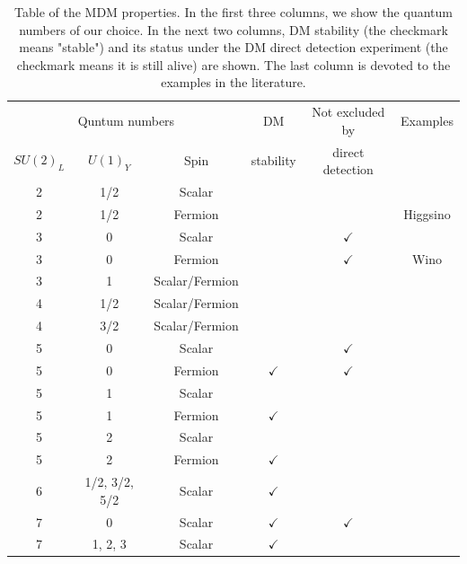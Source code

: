 \documentclass[12pt,twoside,book]{article}
\begin{document}
\begin{table}
  \centering
  \begin{tabular}{ccc|c|c|c}
    \multicolumn{3}{c|}{Quntum numbers} & DM & Not excluded by & Examples\\
    $SU(2)_L$ & $U(1)_Y$ & Spin & stability & direct detection & \\ \hline
    \hline
    2 & 1/2 & Scalar & & & \\
    2 & 1/2 & Fermion & & & Higgsino\\ \hline
    3 & 0 & Scalar & & $\checkmark$ & \cite{Farina:2013mla} \\
    3 & 0 & Fermion & & $\checkmark$ & Wino\\
    3 & 1 & Scalar/Fermion & & & \cite{Farina:2013mla} \\ \hline
    4 & 1/2 & Scalar/Fermion & & & \cite{Farina:2013mla} \\
    4 & 3/2 & Scalar/Fermion & & & \cite{Farina:2013mla} \\ \hline
    5 & 0 & Scalar & & $\checkmark$ & \cite{Farina:2013mla} \\
    5 & 0 & Fermion & $\checkmark$ & $\checkmark$ &
      \cite{Cirelli:2005uq, Cirelli:2007xd, Cirelli:2009uv} \\
    5 & 1 & Scalar & & & \\
    5 & 1 & Fermion & $\checkmark$ & & \\
    5 & 2 & Scalar & & & \\
    5 & 2 & Fermion & $\checkmark$ & & \\ \hline
    6 & 1/2, 3/2, 5/2 & Scalar & $\checkmark$ & & \\ \hline
    7 & 0 & Scalar & $\checkmark$ & $\checkmark$ &
      \cite{Cirelli:2005uq, Cirelli:2007xd, Cirelli:2009uv} \\
    7 & 1, 2, 3 & Scalar & $\checkmark$ & & \\
  \end{tabular}
  \caption{
    Table of the MDM properties.
    In the first three columns, we show the quantum numbers of our choice.
    In the next two columns, DM stability (the checkmark means "stable") and its status under the DM direct detection experiment (the checkmark means it is still alive) are shown.
    The last column is devoted to the examples in the literature.
  }
  \label{tab:mdms}
\end{table}
\end{document}
